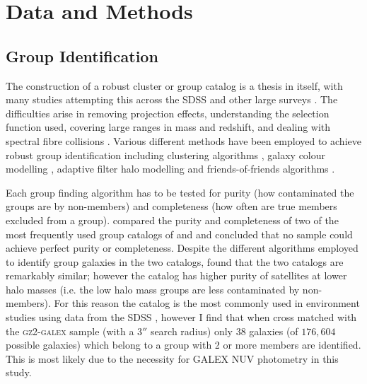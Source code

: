  
 
\section{Data and Methods}\label{sec:data}

\subsection{Group Identification}\label{sec:groups}

The construction of a robust cluster or group catalog is a thesis in itself, with many studies attempting this across the SDSS \citep{merchan05, miller05, berlind06, yang07, tago08, tago10, tinker11, munoz12, tempel14} and other large surveys \citep{tucker00, merchan02, eke04, cucciati10, robotham11, knobel12}. The difficulties arise in removing projection effects, understanding the selection function used, covering large ranges in mass and redshift, and dealing with spectral fibre collisions \citep[see comprehensive review by][for an in depth discussion]{postman02}. Various different methods have been employed to achieve robust group identification including clustering algorithms \citep[e.g.][]{miller05}, galaxy colour modelling \citep{koester07}, adaptive filter halo modelling \citep{yang05, yang07} and friends-of-friends algorithms \citep{goto05, merchan05, berlind06}. 

Each group finding algorithm has to be tested for purity (how contaminated the groups are by non-members) and completeness (how often are true members excluded from a group). \citet{campbell15} compared the purity and completeness of two of the most frequently used group catalogs of \citet[][a friends-of-friends algorithm]{berlind06} and \citet[][a halo modelling algorithm]{yang07} and concluded that no sample could achieve perfect purity or completeness. Despite the different algorithms employed to identify group galaxies in the two catalogs, \citeauthor{campbell15} found that the two catalogs are remarkably similar; however the \citeauthor{yang07} catalog has higher purity of satellites at lower halo masses (i.e. the low halo mass groups are less contaminated by non-members). For this reason the \citeauthor{yang07} catalog is the most commonly used in environment studies using data from the SDSS \citep[including][]{hoyle11, pasquali12, wetzel14, shankar14, lacerna14, knobel15, fitzpatrick15, lan16, woo16, bluck16, weigel16}, however I find that when cross matched with the \textsc{gz2-galex} sample (with a $3''$ search radius) only $38$ galaxies (of $176,604$ possible galaxies) which belong to a group with 2 or more members are identified. This is most likely due to the necessity for GALEX NUV photometry in this study. 

